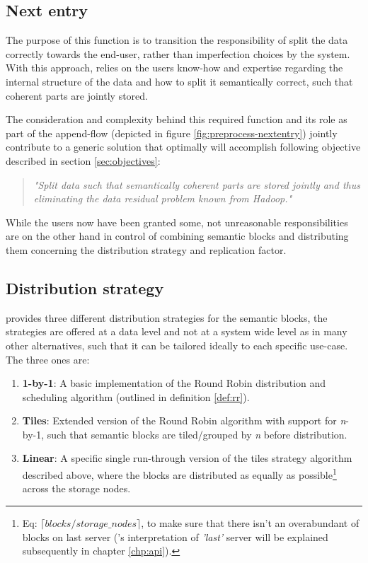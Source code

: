 \subsection{Next entry}
The purpose of this function is to transition the responsibility of split the data correctly towards the end-user, rather than imperfection choices by the system. With this approach, \CodeName relies on the users know-how and expertise regarding the internal structure of the data and how to split it semantically correct, such that coherent parts are jointly stored.
\newline

The consideration and complexity behind this required function and its role as part of the append-flow (depicted in figure \ref{fig:preprocess-nextentry}) jointly contribute to a generic solution that optimally will accomplish following objective described in section \ref{sec:objectives}: 

\begin{quotation}
	\textit{"Split data such that semantically coherent parts are stored jointly and thus eliminating the data residual problem known from Hadoop."}
\end{quotation}
\vspace*{3mm}

While the users now have been granted some, not unreasonable responsibilities are \CodeName on the other hand in control of combining semantic blocks and distributing them concerning the distribution strategy and replication factor.

\subsection{Distribution strategy}
\CodeName provides three different distribution strategies for the semantic blocks, the strategies are offered at a data level and not at a system wide level as in many other alternatives, such that it can be tailored ideally to each specific use-case. The three ones are:

\begin{enumerate}
	\item \textbf{1-by-1}: A basic implementation of the Round Robin distribution and scheduling algorithm (outlined in definition \ref{def:rr}).
	\item \textbf{Tiles}: Extended version of the Round Robin algorithm with support for \textit{n}-by-1, such that semantic blocks are tiled/grouped by \textit{n} before distribution.
	\item \textbf{Linear}: A specific single run-through version of the tiles strategy algorithm described above, where the blocks are distributed as equally as possible\footnote{ Eq: $\lceil blocks / storage\_nodes\rceil$, to make sure that there isn't an overabundant of blocks on last server (\CodeNameShort's interpretation of \textit{'last'} server will be explained subsequently in chapter \ref{chp:api}).} across the storage nodes.
\end{enumerate}
\vspace*{5mm}

